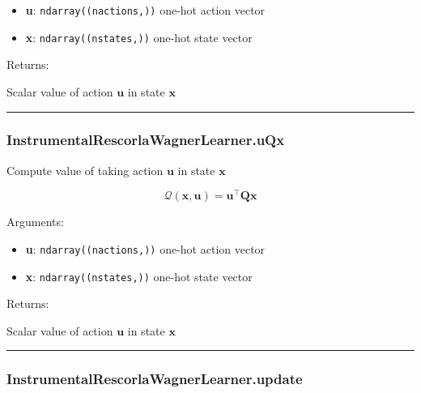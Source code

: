 \begin{itemize}
\tightlist
\item
  \textbf{u}: \texttt{ndarray((nactions,))} one-hot action vector
\item
  \textbf{x}: \texttt{ndarray((nstates,))} one-hot state vector
\end{itemize}

Returns:

Scalar value of action \(\mathbf u\) in state \(\mathbf x\)

\begin{center}\rule{0.5\linewidth}{\linethickness}\end{center}

\subsubsection{InstrumentalRescorlaWagnerLearner.uQx}\label{instrumentalrescorlawagnerlearner.uqx}

\begin{Shaded}
\begin{Highlighting}[]
\end{Highlighting}
\end{Shaded}

Compute value of taking action \(\mathbf u\) in state \(\mathbf x\)

\[
\mathcal Q(\mathbf x, \mathbf u) = \mathbf u^\top \mathbf Q \mathbf x
\]

Arguments:

\begin{itemize}
\tightlist
\item
  \textbf{u}: \texttt{ndarray((nactions,))} one-hot action vector
\item
  \textbf{x}: \texttt{ndarray((nstates,))} one-hot state vector
\end{itemize}

Returns:

Scalar value of action \(\mathbf u\) in state \(\mathbf x\)

\begin{center}\rule{0.5\linewidth}{\linethickness}\end{center}

\subsubsection{InstrumentalRescorlaWagnerLearner.update}\label{instrumentalrescorlawagnerlearner.update}

